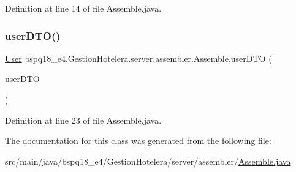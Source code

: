 Definition at line 14 of file Assemble.\+java.

\mbox{\label{classbspq18__e4_1_1_gestion_hotelera_1_1server_1_1assembler_1_1_assemble_ac77b93be577e0042a811486117d9e67a}} 
\subsubsection{\texorpdfstring{user\+D\+T\+O()}{userDTO()}}
{\footnotesize\ttfamily \mbox{\hyperlink{classbspq18__e4_1_1_gestion_hotelera_1_1server_1_1data_1_1_user}{User}} bspq18\+\_\+e4.\+Gestion\+Hotelera.\+server.\+assembler.\+Assemble.\+user\+D\+TO (\begin{DoxyParamCaption}\item[{\mbox{\hyperlink{classbspq18__e4_1_1_gestion_hotelera_1_1server_1_1dto_1_1_user_d_t_o}{User\+D\+TO}}}]{user\+D\+TO }\end{DoxyParamCaption})}



Definition at line 23 of file Assemble.\+java.



The documentation for this class was generated from the following file\+:\begin{DoxyCompactItemize}
\item 
src/main/java/bspq18\+\_\+e4/\+Gestion\+Hotelera/server/assembler/\mbox{\hyperlink{_assemble_8java}{Assemble.\+java}}\end{DoxyCompactItemize}
